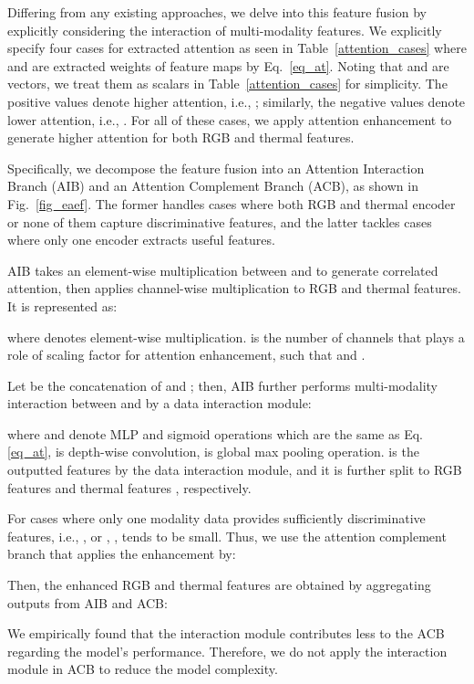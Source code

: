\documentclass[letterpaper, 10 pt, journal, twoside]{IEEEtran}
\begin{document}
Differing from any existing approaches, we delve into this feature fusion by explicitly considering the interaction of multi-modality features. 
We explicitly specify four cases for extracted attention as seen in Table~\ref{attention_cases} where  and  are extracted weights of feature maps by Eq.~\eqref{eq_at}. Noting that  and  are vectors, we treat them as scalars in Table~\ref{attention_cases} for simplicity. The positive values denote higher attention, i.e., ; similarly, the negative values denote lower attention, i.e., . 
For all of these cases, we apply attention enhancement to generate higher attention for both RGB and thermal features.

Specifically, we decompose the feature fusion into an Attention Interaction Branch (AIB) and an Attention Complement Branch (ACB), as shown in Fig.~\ref{fig_eaef}. The former handles cases where both RGB and thermal encoder or none of them capture discriminative features, and the latter tackles cases where only one encoder extracts useful features.


AIB takes an element-wise multiplication between  and  to generate correlated attention, then applies channel-wise multiplication to RGB and thermal features. It is represented as:


where  denotes element-wise multiplication.
 is the number of channels that plays a role of scaling factor for attention enhancement, such that  and .

Let  be the concatenation of  and ; then, AIB further performs multi-modality interaction between  and  by a data interaction module:

where  and  denote MLP and sigmoid operations which are the same as Eq.\eqref{eq_at},  is depth-wise convolution,  is global max pooling operation.  is the outputted features by the data interaction module, and it is further split to RGB features  and thermal features , respectively.


For cases where only one modality data provides sufficiently discriminative features, i.e., ,  or , ,  tends to be small. Thus, we use the attention complement branch that applies the enhancement by:


Then, the enhanced RGB and thermal features are obtained by aggregating outputs from AIB and ACB:

We empirically found that the interaction module contributes less to the ACB regarding the model's performance. Therefore, we do not apply the interaction module in ACB to reduce the model complexity.
\end{document}
